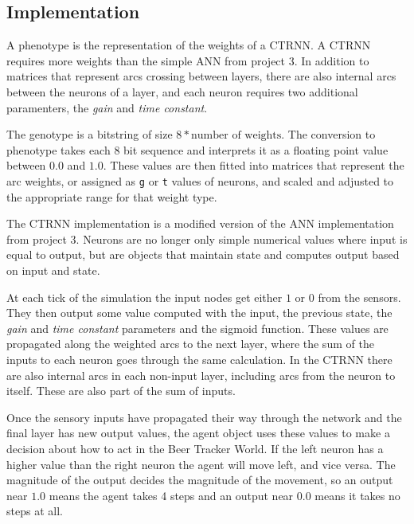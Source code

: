 \documentclass[twoside]{article}
\begin{document}
\begin{multicols}{2} %

    \section{Implementation}
    A phenotype is the representation of the weights of a CTRNN.
    A CTRNN requires more weights than the simple ANN from project 3.
    In addition to matrices that represent arcs crossing between layers,
    there are also internal arcs between the neurons of a layer,
    and each neuron requires two additional paramenters, the \textit{gain} and \textit{time constant}.

    The genotype is a bitstring of size $8 * \text{number of weights}$.
    The conversion to phenotype takes each 8 bit sequence and interprets it as a floating point value between $0.0$ and $1.0$.
    These values are then fitted into matrices that represent the arc weights,
    or assigned as \texttt{g} or \texttt{t} values of neurons,
    and scaled and adjusted to the appropriate range for that weight type.

    The CTRNN implementation is a modified version of the ANN implementation from project 3.
    Neurons are no longer only simple numerical values where input is equal to output,
    but are objects that maintain state and computes output based on input and state.

    At each tick of the simulation the input nodes get either $1$ or $0$ from the sensors.
    They then output some value computed with the input, the previous state, the \textit{gain} and \textit{time constant} parameters and the sigmoid function.
    These values are propagated along the weighted arcs to the next layer,
    where the sum of the inputs to each neuron goes through the same calculation.
    In the CTRNN there are also internal arcs in each non-input layer,
    including arcs from the neuron to itself.
    These are also part of the sum of inputs.

    Once the sensory inputs have propagated their way through the network and the final layer has new output values,
    the agent object uses these values to make a decision about how to act in the Beer Tracker World.
    If the left neuron has a higher value than the right neuron the agent will move left, and vice versa.
    The magnitude of the output decides the magnitude of the movement,
    so an output near $1.0$ means the agent takes 4 steps and an output near $0.0$ means it takes no steps at all.


\end{multicols}
\end{document}
